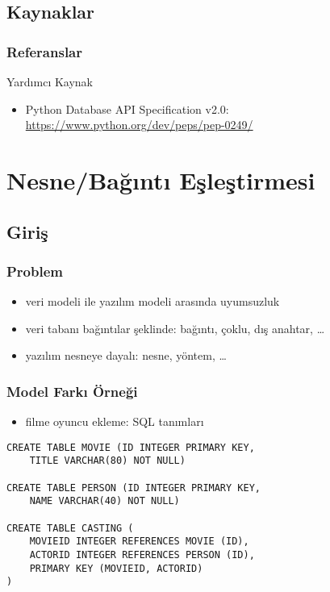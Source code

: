 \documentclass[dvipsnames]{beamer}
\theoremstyle{plain}
\begin{document}
\subsection*{Kaynaklar}

\begin{frame}
  \frametitle{Referanslar}

  \begin{block}{Yardımcı Kaynak}
    \begin{itemize}
      \item Python Database API Specification v2.0:\\
        \url{https://www.python.org/dev/peps/pep-0249/}
    \end{itemize}
  \end{block}
\end{frame}

\section{Nesne/Bağıntı Eşleştirmesi}

\subsection{Giriş}

\begin{frame}
  \frametitle{Problem}

  \begin{itemize}
    \item veri modeli ile yazılım modeli arasında uyumsuzluk

    \medskip
    \item veri tabanı bağıntılar şeklinde: bağıntı, çoklu, dış anahtar, \ldots
    \item yazılım nesneye dayalı: nesne, yöntem, \ldots
  \end{itemize}
\end{frame}

\begin{frame}[fragile]
  \frametitle{Model Farkı Örneği}

  \begin{itemize}
    \item filme oyuncu ekleme: SQL tanımları
  \end{itemize}

  \begin{lstlisting}[language=FullSQL]
CREATE TABLE MOVIE (ID INTEGER PRIMARY KEY,
    TITLE VARCHAR(80) NOT NULL)

CREATE TABLE PERSON (ID INTEGER PRIMARY KEY,
    NAME VARCHAR(40) NOT NULL)

CREATE TABLE CASTING (
    MOVIEID INTEGER REFERENCES MOVIE (ID),
    ACTORID INTEGER REFERENCES PERSON (ID),
    PRIMARY KEY (MOVIEID, ACTORID)
)
  \end{lstlisting}
\end{frame}
\end{document}
